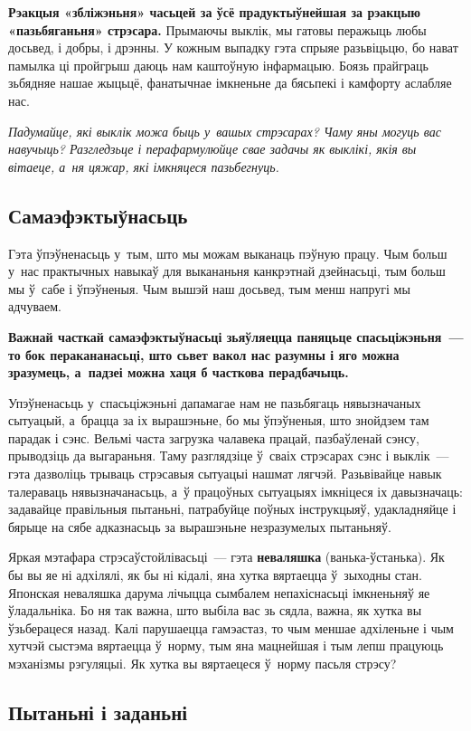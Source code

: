 \textbf{Рэакцыя «збліжэньня» часьцей за ўсё прадуктыўнейшая за рэакцыю «пазьбяганьня» стрэсара.} Прымаючы выклік, мы гатовы перажыць любы досьвед, і добры, і дрэнны. У кожным выпадку гэта спрыяе разьвіцьцю, бо нават памылка ці пройгрыш даюць нам каштоўную інфармацыю. Боязь прайграць зьбядняе нашае жыцьцё, фанатычнае імкненьне да бясьпекі і камфорту аслабляе нас.

\emph{Падумайце, які выклік можа быць у~вашых стрэсарах? Чаму яны могуць вас навучыць? Разгледзьце і перафармулюйце свае задачы як выклікі, якія вы вітаеце, а~ня цяжар, які імкняцеся пазьбегнуць.}

\subsection*{Самаэфэктыўнасьць}

Гэта ўпэўненасьць у~тым, што мы можам выканаць пэўную працу. Чым больш у~нас практычных навыкаў для выкананьня канкрэтнай дзейнасьці, тым больш мы ў~сабе і ўпэўненыя. Чым вышэй наш досьвед, тым менш напругі мы адчуваем. 

\textbf{Важнай часткай самаэфэктыўнасьці зьяўляецца паняцьце спасьціжэньня~--- то бок перакананасьці, што сьвет вакол нас разумны і яго можна зразумець, а~падзеі можна хаця б часткова перадбачыць.}

Упэўненасьць у~спасьціжэньні дапамагае нам не пазьбягаць нявызначаных сытуацый, а~брацца за іх вырашэньне, бо мы ўпэўненыя, што знойдзем там парадак і сэнс. Вельмі часта загрузка чалавека працай, пазбаўленай сэнсу, прыводзіць да выгараньня. Таму разглядзіце ў~сваіх стрэсарах сэнс і выклік~--- гэта дазволіць трываць стрэсавыя сытуацыі нашмат лягчэй. Разьвівайце навык талераваць нявызначанасьць, а~ў працоўных сытуацыях імкніцеся іх давызначаць: задавайце правільныя пытаньні, патрабуйце поўных інструкцыяў, удакладняйце і бярыце на сябе адказнасьць за вырашэньне незразумелых пытаньняў.

Яркая мэтафара стрэсаўстойлівасьці~--- гэта \textbf{неваляшка} (ванька-ўстанька). Як бы вы яе ні адхілялі, як бы ні кідалі, яна хутка вяртаецца ў~зыходны стан. Японская неваляшка дарума лічыцца сымбалем непахіснасьці імкненьняў яе ўладальніка. Бо ня так важна, што выбіла вас зь сядла, важна, як хутка вы ўзьберацеся назад. Калі парушаецца гамэастаз, то чым меншае адхіленьне і чым хутчэй сыстэма вяртаецца ў~норму, тым яна мацнейшая і тым лепш працуюць мэханізмы рэгуляцыі. Як хутка вы вяртаецеся ў~норму пасьля стрэсу?

\subsection*{Пытаньні і заданьні}

